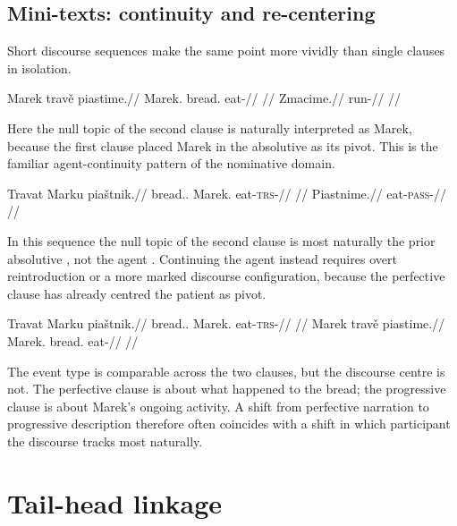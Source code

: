 \subsection{Mini-texts: continuity and re-centering}

Short discourse sequences make the same point more vividly than single clauses
in isolation.

\pex
\a
\begingl
\gla Marek travě piastime.//
\glb Marek.\Dir{} bread.\Ind{} eat-\Prog{}//
\glft {}//
\endgl
\a
\begingl
\gla Zmacime.//
\glb run-\Prog{}//
\glft {} //
\endgl
\xe

\noindent Here the null topic of the second clause is naturally interpreted as
Marek, because the first clause placed Marek in the absolutive as its pivot.
This is the familiar agent-continuity pattern of the nominative domain.

\pex
\a
\begingl
\gla Travat Marku piaštnik.//
\glb bread.\Dir{}.\Def{} Marek.\Trs{} eat-\textsc{trs}-\Pf{}//
\glft {}//
\endgl
\a
\begingl
\gla Piastnime.//
\glb eat-\textsc{pass}-\Prog{}//
\glft {} //
\endgl
\xe

\noindent In this sequence the null topic of the second clause is most naturally
the prior absolutive  , not the agent .
Continuing the agent instead requires overt reintroduction or a more marked
discourse configuration, because the perfective clause has already centred the
patient as pivot.

\pex
\a
\begingl
\gla Travat Marku piaštnik.//
\glb bread.\Dir{}.\Def{} Marek.\Trs{} eat-\textsc{trs}-\Pf{}//
\glft {}//
\endgl
\a
\begingl
\gla Marek travě piastime.//
\glb Marek.\Dir{} bread.\Ind{} eat-\Prog{}//
\glft {} //
\endgl
\xe

\noindent The event type is comparable across the two clauses, but the discourse
centre is not. The perfective clause is about what happened to the bread; the
progressive clause is about Marek's ongoing activity. A shift from perfective
narration to progressive description therefore often coincides with a shift in
which participant the discourse tracks most naturally.

\section{Tail-head linkage}\label{sec:tail-head}

